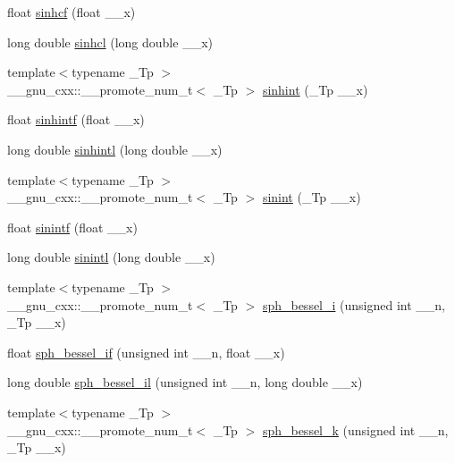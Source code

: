 \begin{DoxyCompactItemize}
\item 
float \hyperlink{namespace____gnu__cxx_adaa7ea78625cc2eeb70213a50719813d}{sinhcf} (float \+\_\+\+\_\+x)
\item 
long double \hyperlink{namespace____gnu__cxx_a7467a001bb18ef8bff0a7e9927bab356}{sinhcl} (long double \+\_\+\+\_\+x)
\item 
{\footnotesize template$<$typename \+\_\+\+Tp $>$ }\\\+\_\+\+\_\+gnu\+\_\+cxx\+::\+\_\+\+\_\+promote\+\_\+num\+\_\+t$<$ \+\_\+\+Tp $>$ \hyperlink{namespace____gnu__cxx_a19941fbce9fb8e097eb757761f9326db}{sinhint} (\+\_\+\+Tp \+\_\+\+\_\+x)
\item 
float \hyperlink{namespace____gnu__cxx_a375ca3ceb1eafd678e298d0aea4bb3e6}{sinhintf} (float \+\_\+\+\_\+x)
\item 
long double \hyperlink{namespace____gnu__cxx_a8b7f1a070be7233a3179e3cbded387ee}{sinhintl} (long double \+\_\+\+\_\+x)
\item 
{\footnotesize template$<$typename \+\_\+\+Tp $>$ }\\\+\_\+\+\_\+gnu\+\_\+cxx\+::\+\_\+\+\_\+promote\+\_\+num\+\_\+t$<$ \+\_\+\+Tp $>$ \hyperlink{namespace____gnu__cxx_a4b0807985bd194392fc7d7abe4cf2c61}{sinint} (\+\_\+\+Tp \+\_\+\+\_\+x)
\item 
float \hyperlink{namespace____gnu__cxx_a8b63406fec50d7e00470521b82fb32a2}{sinintf} (float \+\_\+\+\_\+x)
\item 
long double \hyperlink{namespace____gnu__cxx_a3ff83e5c5f1435064b6942ca8b7c8779}{sinintl} (long double \+\_\+\+\_\+x)
\item 
{\footnotesize template$<$typename \+\_\+\+Tp $>$ }\\\+\_\+\+\_\+gnu\+\_\+cxx\+::\+\_\+\+\_\+promote\+\_\+num\+\_\+t$<$ \+\_\+\+Tp $>$ \hyperlink{namespace____gnu__cxx_a93454a071a189f7cc9e79078526aa3fd}{sph\+\_\+bessel\+\_\+i} (unsigned int \+\_\+\+\_\+n, \+\_\+\+Tp \+\_\+\+\_\+x)
\item 
float \hyperlink{namespace____gnu__cxx_acc6738f18c1ba19452b9dd814d11c00c}{sph\+\_\+bessel\+\_\+if} (unsigned int \+\_\+\+\_\+n, float \+\_\+\+\_\+x)
\item 
long double \hyperlink{namespace____gnu__cxx_af4392d9ed177913febdcbfccb947dbca}{sph\+\_\+bessel\+\_\+il} (unsigned int \+\_\+\+\_\+n, long double \+\_\+\+\_\+x)
\item 
{\footnotesize template$<$typename \+\_\+\+Tp $>$ }\\\+\_\+\+\_\+gnu\+\_\+cxx\+::\+\_\+\+\_\+promote\+\_\+num\+\_\+t$<$ \+\_\+\+Tp $>$ \hyperlink{namespace____gnu__cxx_a737e6fe2f7f4acb6fcc6bccfe2a4c254}{sph\+\_\+bessel\+\_\+k} (unsigned int \+\_\+\+\_\+n, \+\_\+\+Tp \+\_\+\+\_\+x)

\end{DoxyCompactItemize}
